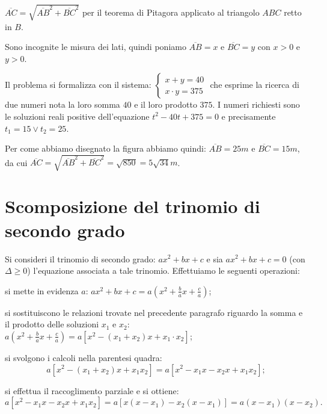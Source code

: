 \begin{soluzione}

$\overline{AC} = \sqrt{\overline{AB}^{2} + \overline{BC}^{2}}$ per il teorema di Pitagora applicato al triangolo $ABC$ retto in $B$.

Sono incognite le misura dei lati, quindi poniamo $\overline{AB}=x$ e $\overline {BC}=y$ con $x>0$ e $y>0$.

Il problema si formalizza con il sistema:
$\left\{ \begin{array}{l} x + y = 40 \\x \cdot y = 375 \end{array}\right.$
che esprime la ricerca di due numeri nota la loro somma $40$ e il loro prodotto $375$. I numeri richiesti sono le soluzioni reali positive dell'equazione $t^{2} - 40 t + 375 = 0$ e precisamente $t_{1} = 15 \vee t_{2} = 25$.

Per come abbiamo disegnato la figura abbiamo quindi: $\overline{AB} = 25\unit{m}$ e $\overline{BC} = 15\unit{m}$, da cui $\overline{AC} = \sqrt{\overline{AB}^{2} + \overline{BC}^{2}} =\sqrt{850} = 5 \sqrt{34}\unit{m}$.
\end{soluzione}

\vspazio\ovalbox{\risolvii \ref{ese:3.91}, \ref{ese:3.92}, \ref{ese:3.93}}

\section{Scomposizione del trinomio di secondo grado}

Si consideri il trinomio di secondo grado: $a x^{2} + b x + c$ e sia $a x^{2} + b x + c = 0$ (con $\Delta \geq 0$) l'equazione associata a tale trinomio. Effettuiamo le seguenti operazioni:
\begin{itemize*}
\item si mette in evidenza $a$: $a x^{2} + b x + c = a \left( x^{2} + \frac{b}{a} x + \frac{c}{a} \right)$;
\item si sostituiscono le relazioni trovate nel precedente paragrafo riguardo la somma e il prodotto delle soluzioni $x_{1}$ e $x_{2}$: $a \left( x^{2} + \frac{b}{a} x + \frac{c}{a} \right) = a \left[x^{2} - ( x_{1} + x_{2} ) x + x_{1} \cdot x_{2} \right]$;
\item si svolgono i calcoli nella parentesi quadra:
\[a \left[ x^{2} - ( x_{1} + x_{2} ) x + x_{1} x_{2}\right] = a\left[ x^{2} - x_{1} x - x_{2} x + x_{1} x_{2}\right];\]
\item si effettua il raccoglimento parziale e si ottiene:
\[a \left[x^{2} - x_{1} x - x_{2} x + x_{1} x_{2}\right] = a \left[ {x \left(x - x_{1} \right) - x_{2} \left( x - x_{1}\right)}\right] = a \left( x - x_{1} \right) \left( x - x_{2} \right).\]
\end{itemize*}

